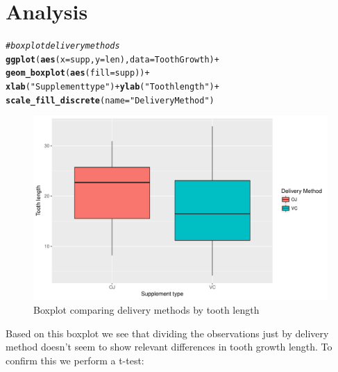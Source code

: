\documentclass{article}\usepackage[]{graphicx}\usepackage[]{color}
\makeatletter
\def\maxwidth{ %
  \ifdim\Gin@nat@width>\linewidth
    \linewidth
  \else
    \Gin@nat@width
  \fi
}
\newcommand{\hlstr}[1]{\textcolor[rgb]{0.192,0.494,0.8}{#1}}%
\newcommand{\hlcom}[1]{\textcolor[rgb]{0.678,0.584,0.686}{\textit{#1}}}%
\newcommand{\hlopt}[1]{\textcolor[rgb]{0,0,0}{#1}}%
\newcommand{\hlstd}[1]{\textcolor[rgb]{0.345,0.345,0.345}{#1}}%
\newcommand{\hlkwc}[1]{\textcolor[rgb]{0.333,0.667,0.333}{#1}}%
\newcommand{\hlkwd}[1]{\textcolor[rgb]{0.737,0.353,0.396}{\textbf{#1}}}%
\newenvironment{kframe}{%
 \def\at@end@of@kframe{}%
 \ifinner\ifhmode%
  \def\at@end@of@kframe{\end{minipage}}%
  \begin{minipage}{\columnwidth}%
 \fi\fi%
 \def\FrameCommand##1{\hskip\@totalleftmargin \hskip-\fboxsep
 \colorbox{shadecolor}{##1}\hskip-\fboxsep
     \hskip-\linewidth \hskip-\@totalleftmargin \hskip\columnwidth}%
 \MakeFramed {\advance\hsize-\width
   \@totalleftmargin\z@ \linewidth\hsize
   \@setminipage}}%
 {\par\unskip\endMakeFramed%
 \at@end@of@kframe}
\newenvironment{knitrout}{}{} %
\makeatother
\begin{document}
\section{Analysis}
\begin{knitrout}
\color{fgcolor}\begin{kframe}
\begin{alltt}
\hlcom{# boxplot delivery methods}
\hlkwd{ggplot}\hlstd{(}\hlkwd{aes}\hlstd{(}\hlkwc{x}\hlstd{=supp,} \hlkwc{y}\hlstd{=len),} \hlkwc{data}\hlstd{=ToothGrowth)} \hlopt{+}
  \hlkwd{geom_boxplot}\hlstd{(}\hlkwd{aes}\hlstd{(}\hlkwc{fill}\hlstd{=supp))}\hlopt{+}
        \hlkwd{xlab}\hlstd{(}\hlstr{"Supplement type"}\hlstd{)} \hlopt{+}\hlkwd{ylab}\hlstd{(}\hlstr{"Tooth length"}\hlstd{)} \hlopt{+}
  \hlkwd{scale_fill_discrete}\hlstd{(}\hlkwc{name}\hlstd{=}\hlstr{"Delivery Method"}\hlstd{)}
\end{alltt}
\end{kframe}\begin{figure}[h]
\includegraphics[width=\maxwidth]{figure/boxplot2-1} \caption[Boxplot comparing delivery methods by tooth length]{Boxplot comparing delivery methods by tooth length}\label{fig:boxplot2}
\end{figure}


\end{knitrout}

Based on this boxplot we see that dividing the observations just by delivery method doesn't seem to show relevant differences in tooth growth length. To confirm this we perform a t-test:
\end{document}
